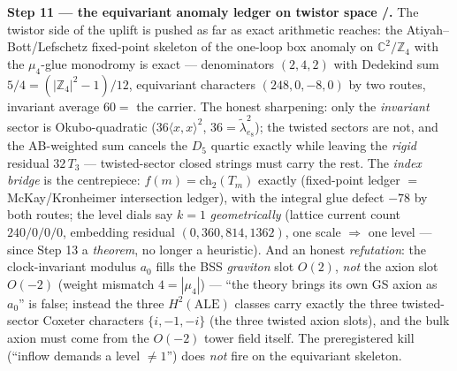 \documentclass[11pt,a4paper]{article}
\newcommand{\Z}{\mathbb{Z}}
\theoremstyle{definition}
\begin{document}
\par\smallskip\noindent\textbf{Step 11 --- the equivariant anomaly ledger on twistor space
\mE/\mC.} The twistor side of the uplift is pushed as far as exact arithmetic reaches: the
Atiyah--Bott/Lefschetz fixed-point skeleton of the one-loop box anomaly on $\mathbb C^2/\Z_4$ with
the $\mu_4$-glue monodromy is exact --- denominators $(2,4,2)$ with Dedekind sum
$5/4=(|\Z_4|^2{-}1)/12$, equivariant characters $(248,0,-8,0)$ by two routes, invariant average
$60=$ the carrier. The honest sharpening: only the \emph{invariant} sector is Okubo-quadratic
($36\langle x,x\rangle^2$, $36=\tilde\lambda^2_{e_8}$); the twisted sectors are not, and the
AB-weighted sum cancels the $D_5$ quartic exactly while leaving the \emph{rigid} residual
$32\,T_3$ --- twisted-sector closed strings must carry the rest. The \emph{index bridge} is the
centrepiece: $f(m)=\mathrm{ch}_2(T_m)$ exactly (fixed-point ledger $=$ McKay/Kronheimer
intersection ledger), with the integral glue defect $-78$ by both routes; the level dials say
$k=1$ \emph{geometrically} (lattice current count $240/0/0/0$, embedding residual
$(0,360,814,1362)$, one scale $\Rightarrow$ one level --- since Step 13 a \emph{theorem}, no
longer a heuristic). And an honest \emph{refutation}: the
clock-invariant modulus $a_0$ fills the BSS \emph{graviton} slot $O(2)$, \emph{not} the axion slot
$O(-2)$ (weight mismatch $4=|\mu_4|$) --- ``the theory brings its own GS axion as $a_0$'' is
false; instead the three $H^2(\mathrm{ALE})$ classes carry exactly the three twisted-sector
Coxeter characters $\{i,-1,-i\}$ (the three twisted axion slots), and the bulk axion must come
from the $O(-2)$ tower field itself. The preregistered kill (``inflow demands a level $\neq1$'')
does \emph{not} fire on the equivariant skeleton.
\end{document}
